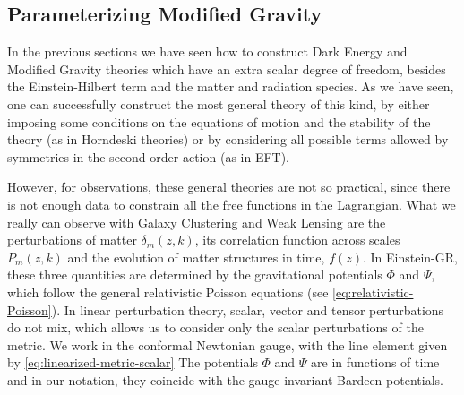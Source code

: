\subsection{Parameterizing Modified Gravity \label{sub:parameterizing-MG}}

In the previous sections we have seen how to construct Dark Energy and Modified Gravity theories 
which have an extra scalar degree of freedom, besides the Einstein-Hilbert term and the matter and radiation species.
As we have seen, one can successfully construct the most general theory of this kind, by either imposing
some conditions on the equations of motion and the stability of the theory (as in Horndeski theories) or by considering all
possible terms allowed by symmetries in the second order action (as in EFT).

However, for observations, these general theories are not so practical, since there is not enough data to constrain
all the free functions in the Lagrangian. What we really can observe with Galaxy Clustering and Weak Lensing 
are the perturbations of matter $\delta_m(z,k)$, its correlation function across scales $P_m(z,k)$ and the
evolution of matter structures in time, $f(z)$.
In Einstein-GR, these three quantities are determined by the gravitational potentials $\Phi$ and $\Psi$, which follow 
the general relativistic Poisson equations (see \cref{eq:relativistic-Poisson}). 
In linear perturbation theory, scalar, vector and tensor perturbations
do not mix, which allows us to consider only the scalar perturbations of the metric. 
We work in the conformal Newtonian gauge, with the
line element given by \cref{eq:linearized-metric-scalar}
The potentials $\Phi$ and $\Psi$ are in functions of time and in our notation, they coincide
with the gauge-invariant Bardeen potentials.


